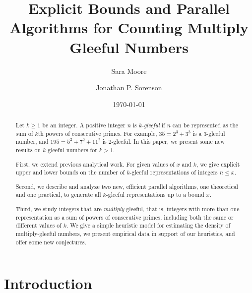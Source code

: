 \documentclass[11pt]{amsart}
\numberwithin{equation}{section}
\numberwithin{algorithm}{section}
\begin{document}


\author{Sara Moore}
\address{Department of Physics \&\ Astronomy, University of Rochester, Rochester, New York 14627 }

 \author{Jonathan P. Sorenson}
 \address{Computer Science and Software Engineering Department,
   Butler University, Indianapolis, Indiana 46208}




\title{Explicit Bounds and Parallel Algorithms for Counting Multiply Gleeful Numbers}

\begin{abstract}
  Let $k\ge 1$ be an integer.
    A positive integer $n$ is $k$-\textit{gleeful} if $n$
    can be represented as the sum of $k$th powers of
    consecutive primes.
    For example, $35=2^3+3^3$ is a $3$-gleeful number,
  and $195=5^2+7^2+11^2$ is $2$-gleeful.
    In this paper, 
    we present some new results on $k$-gleeful numbers
    for $k>1$.
    
    First, we extend previous analytical work.
    For given values of $x$ and $k$, 
      we give explicit upper and lower bounds on the number of
      $k$-gleeful representations of integers $n\le x$.
      
    Second, we describe and analyze two new, efficient parallel algorithms,
    one theoretical and one practical, 
    to generate all $k$-gleeful representations up to a bound $x$.
    
    Third, we study integers that are
    \textit{multiply} gleeful, that is, integers with more than one representation as a sum of powers of
    consecutive primes, 
    including both the same or different values of $k$.
    We give a simple heuristic model for estimating
    the density of multiply-gleeful numbers,
    we present empirical data in support of our heuristics,
    and offer some new conjectures.
\end{abstract}


\date{\today}
\maketitle

\section{Introduction}\label{sec:intro}
%
\end{document}

